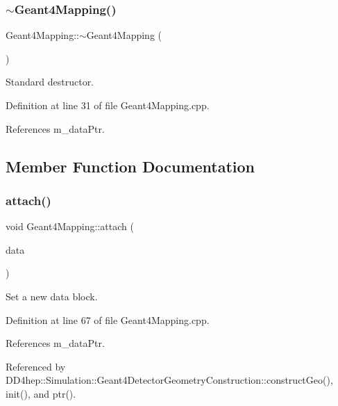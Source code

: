 \subsubsection{\texorpdfstring{$\sim$\+Geant4\+Mapping()}{~Geant4Mapping()}}
{\footnotesize\ttfamily Geant4\+Mapping\+::$\sim$\+Geant4\+Mapping (\begin{DoxyParamCaption}{ }\end{DoxyParamCaption})\hspace{0.3cm}{\ttfamily [virtual]}}



Standard destructor. 



Definition at line 31 of file Geant4\+Mapping.\+cpp.



References m\+\_\+data\+Ptr.



\subsection{Member Function Documentation}
\hypertarget{class_d_d4hep_1_1_simulation_1_1_geant4_mapping_a10366f0a203f866a02f9e550d7a9d950}{}\label{class_d_d4hep_1_1_simulation_1_1_geant4_mapping_a10366f0a203f866a02f9e550d7a9d950} 
\subsubsection{\texorpdfstring{attach()}{attach()}}
{\footnotesize\ttfamily void Geant4\+Mapping\+::attach (\begin{DoxyParamCaption}\item[{\hyperlink{class_d_d4hep_1_1_simulation_1_1_geant4_geometry_info}{Geant4\+Geometry\+Info} $\ast$}]{data }\end{DoxyParamCaption})}



Set a new data block. 



Definition at line 67 of file Geant4\+Mapping.\+cpp.



References m\+\_\+data\+Ptr.



Referenced by D\+D4hep\+::\+Simulation\+::\+Geant4\+Detector\+Geometry\+Construction\+::construct\+Geo(), init(), and ptr().

